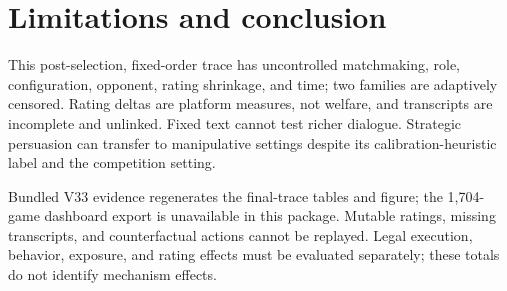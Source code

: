 \section{Limitations and conclusion}

This post-selection, fixed-order trace has uncontrolled matchmaking, role,
configuration, opponent, rating shrinkage, and time; two families are
adaptively censored. Rating deltas are platform measures, not welfare, and
transcripts are incomplete and unlinked. Fixed text cannot test richer
dialogue. Strategic persuasion can transfer to manipulative settings despite
its calibration-heuristic label and the competition setting.

Bundled V33 evidence regenerates the final-trace tables and figure; the
1,704-game dashboard export is unavailable in this package. Mutable ratings,
missing transcripts, and counterfactual actions cannot be replayed. Legal
execution, behavior, exposure, and rating effects must be evaluated
separately; these totals do not identify mechanism effects.
